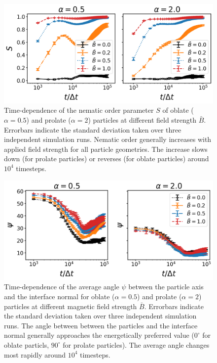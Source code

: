 \begin{figure}
    \centering
    \includegraphics[scale = 0.4]{figures/results/paper1/S-vs-t.png}
    \caption{Time-dependence of the nematic order parameter $S$ of oblate ($\alpha=0.5$) and prolate ($\alpha=2$) 
            particles at different field strength $\bar{B}$. Errorbars indicate the standard deviation taken over 
            three independent simulation runs. Nematic order generally increases with applied field strength for all particle geometries. 
            The increase slows down (for prolate particles) or reverses (for oblate particles) around $10^4$ timesteps.}
    \label{fig:nematic_time}
\end{figure}


\begin{figure}
    \centering
    \includegraphics[scale = 0.4]{figures/results/paper1/psi-vs-t.png}
    \caption{Time-dependence of the average angle $\psi$ between the particle axis and the 
            interface normal for oblate ($\alpha=0.5$) and prolate ($\alpha=2$) particles at different 
            magnetic field strength $\bar{B}$. Errorbars indicate the standard deviation taken over three 
            independent simulation runs. The angle between between the particles and the interface normal generally 
            approaches the energetically preferred value ($0^\circ$ for oblate particls, $90^\circ$ for prolate particles).
            The average angle changes most rapidly around $10^4$ timesteps.}
    \label{fig:psi_time}
\end{figure}


